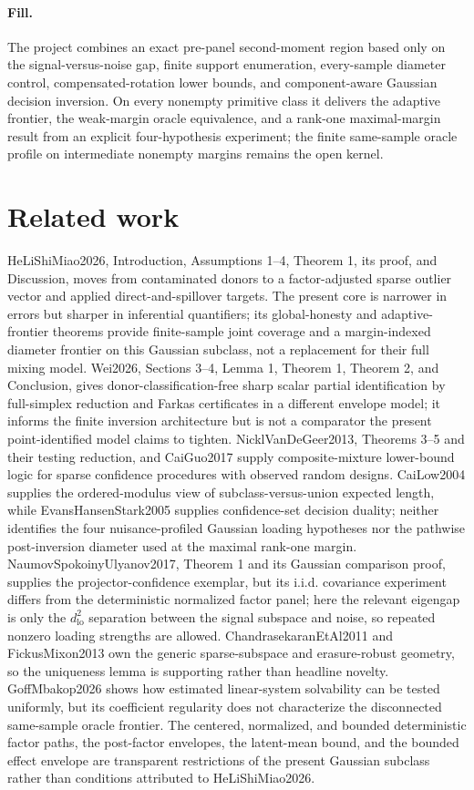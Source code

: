 \documentclass{article}
\begin{document}
\paragraph{Fill.} The project combines an exact pre-panel second-moment region based only on the signal-versus-noise gap, finite support enumeration, every-sample diameter control, compensated-rotation lower bounds, and component-aware Gaussian decision inversion. On every nonempty primitive class it delivers the adaptive frontier, the weak-margin oracle equivalence, and a rank-one maximal-margin result from an explicit four-hypothesis experiment; the finite same-sample oracle profile on intermediate nonempty margins remains the open kernel.

\section{Related work}

HeLiShiMiao2026, Introduction, Assumptions 1--4, Theorem 1, its proof, and Discussion, moves from contaminated donors to a factor-adjusted sparse outlier vector and applied direct-and-spillover targets. The present core is narrower in errors but sharper in inferential quantifiers; its global-honesty and adaptive-frontier theorems provide finite-sample joint coverage and a margin-indexed diameter frontier on this Gaussian subclass, not a replacement for their full mixing model. Wei2026, Sections 3--4, Lemma 1, Theorem 1, Theorem 2, and Conclusion, gives donor-classification-free sharp scalar partial identification by full-simplex reduction and Farkas certificates in a different envelope model; it informs the finite inversion architecture but is not a comparator the present point-identified model claims to tighten. NicklVanDeGeer2013, Theorems 3--5 and their testing reduction, and CaiGuo2017 supply composite-mixture lower-bound logic for sparse confidence procedures with observed random designs. CaiLow2004 supplies the ordered-modulus view of subclass-versus-union expected length, while EvansHansenStark2005 supplies confidence-set decision duality; neither identifies the four nuisance-profiled Gaussian loading hypotheses nor the pathwise post-inversion diameter used at the maximal rank-one margin. NaumovSpokoinyUlyanov2017, Theorem 1 and its Gaussian comparison proof, supplies the projector-confidence exemplar, but its i.i.d. covariance experiment differs from the deterministic normalized factor panel; here the relevant eigengap is only the \(d_{\mathrm{lo}}^2\) separation between the signal subspace and noise, so repeated nonzero loading strengths are allowed. ChandrasekaranEtAl2011 and FickusMixon2013 own the generic sparse-subspace and erasure-robust geometry, so the uniqueness lemma is supporting rather than headline novelty. GoffMbakop2026 shows how estimated linear-system solvability can be tested uniformly, but its coefficient regularity does not characterize the disconnected same-sample oracle frontier. The centered, normalized, and bounded deterministic factor paths, the post-factor envelopes, the latent-mean bound, and the bounded effect envelope are transparent restrictions of the present Gaussian subclass rather than conditions attributed to HeLiShiMiao2026.
\end{document}
